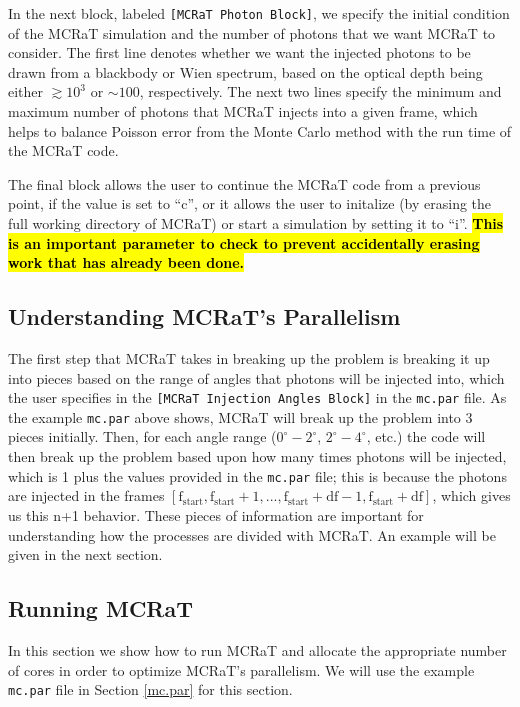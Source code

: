 \documentclass[12pt,a4paper]{article}
\begin{document}
In the next block, labeled \texttt{[MCRaT Photon Block]}, we specify the initial condition of the MCRaT simulation and the number of photons that we want MCRaT to consider. The first line denotes whether we want the injected photons to be drawn from a blackbody or Wien spectrum, based on the optical depth being either $\gtrsim 10^3$ or $\sim 100$, respectively. The next two lines specify the minimum and maximum number of photons that MCRaT injects into a given frame, which helps to balance Poisson error from the Monte Carlo method with the run time of the MCRaT code. 

The final block allows the user to continue the MCRaT code from a previous point, if the value is set to ``c'', or it allows the user to initalize (by erasing the full working directory of MCRaT) or start a simulation by setting it to ``i''. \hl{\bf This is an important parameter to check to prevent accidentally erasing work that has already been done.}


\subsection{Understanding MCRaT's Parallelism}
The first step that MCRaT takes in breaking up the problem is breaking it up into pieces based on the range of angles that photons will be injected into, which the user specifies in the \texttt{[MCRaT Injection Angles Block]} in the \texttt{mc.par} file. As the example \texttt{mc.par} above shows, MCRaT will break up the problem into 3 pieces initially. Then, for each angle range ($0^\circ-2^\circ$, $2^\circ-4^\circ$, etc.) the code will then break up the problem based upon how many times photons will be injected, which is 1 plus the values provided in the \texttt{mc.par} file; this is because the photons are injected in the frames $[\mathrm{f_{start}}, \mathrm{f_{start}}+1, ..., \mathrm{f_{start}}+\mathrm{df}-1, \mathrm{f_{start}}+\mathrm{df}]$, which gives us this n+1 behavior. These pieces of information are important for understanding how the processes are divided with MCRaT. An example will be given in the next section.

\subsection{Running MCRaT}
In this section we show how to run MCRaT and allocate the appropriate number of cores in order to optimize MCRaT's parallelism. We will use the example \texttt{mc.par} file in Section \ref{mc.par} for this section. 
\end{document}
